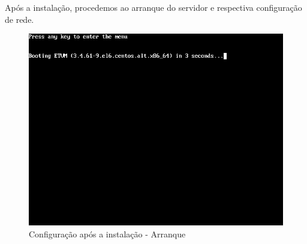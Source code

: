 Após a instalação, procedemos ao arranque do servidor e respectiva configuração de rede.

\begin{figure}[H]
	\begin{center}
    \includegraphics[scale=0.4]{screenshots/install/nuxis/pos_install_bootmenu.png}
    \caption{Configuração após a instalação - Arranque}
	\label{fig:installation_enterprise_pos_01}
	\end{center}
\end{figure}

